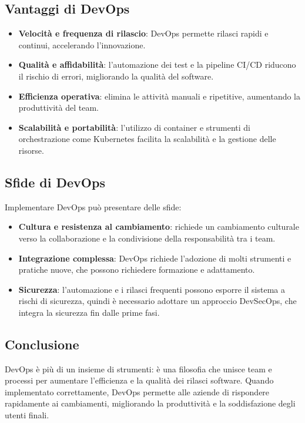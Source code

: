 \documentclass{article}
\begin{document}
\subsection{Vantaggi di DevOps}
\begin{itemize}
    \item \textbf{Velocità e frequenza di rilascio}: DevOps permette rilasci rapidi e continui, accelerando l'innovazione.
    \item \textbf{Qualità e affidabilità}: l'automazione dei test e la pipeline CI/CD riducono il rischio di errori, migliorando la qualità del software.
    \item \textbf{Efficienza operativa}: elimina le attività manuali e ripetitive, aumentando la produttività del team.
    \item \textbf{Scalabilità e portabilità}: l'utilizzo di container e strumenti di orchestrazione come Kubernetes facilita la scalabilità e la gestione delle risorse.
\end{itemize}

\subsection{Sfide di DevOps}
Implementare DevOps può presentare delle sfide:
\begin{itemize}
    \item \textbf{Cultura e resistenza al cambiamento}: richiede un cambiamento culturale verso la collaborazione e la condivisione della responsabilità tra i team.
    \item \textbf{Integrazione complessa}: DevOps richiede l'adozione di molti strumenti e pratiche nuove, che possono richiedere formazione e adattamento.
    \item \textbf{Sicurezza}: l'automazione e i rilasci frequenti possono esporre il sistema a rischi di sicurezza, quindi è necessario adottare un approccio DevSecOps, che integra la sicurezza fin dalle prime fasi.
\end{itemize}

\subsection{Conclusione}
DevOps è più di un insieme di strumenti: è una filosofia che unisce team e processi per aumentare l'efficienza e la qualità dei rilasci software. Quando implementato correttamente, DevOps permette alle aziende di rispondere rapidamente ai cambiamenti, migliorando la produttività e la soddisfazione degli utenti finali.
\end{document}
